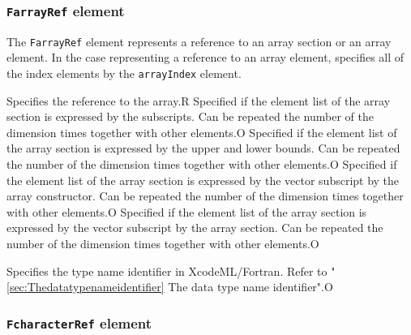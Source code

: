 \subsubsection{ {\tt FarrayRef} element}

The {\tt FarrayRef} element represents a reference to an array section or an array element.
In the case representing a reference to an array element, specifies all of the index
elements by the {\tt arrayIndex} element.


\begin{XcodeMLChildElements}
{Specifies the reference to the array.}{R}
{Specified if the element list of the array section is expressed by the subscripts.
 Can be repeated the number of the dimension times together with other elements.}{O}
{Specified if the element list of the array section is expressed by the upper and lower bounds.
 Can be repeated the number of the dimension times together with other elements.}{O}
{Specified if the element list of the array section is expressed by the vector subscript by the array constructor.
 Can be repeated the number of the dimension times together with other elements.}{O}
{Specified if the element list of the array section is expressed by the vector subscript by the array section.
 Can be repeated the number of the dimension times together with other elements.}{O}
\end{XcodeMLChildElements}

\begin{XcodeMLAttributes}
{Specifies the type name identifier in XcodeML/Fortran.
 Refer to "\ref{sec:Thedatatypenameidentifier} The data type name identifier".}{O}
\end{XcodeMLAttributes}


\subsubsection{ {\tt FcharacterRef} element}

